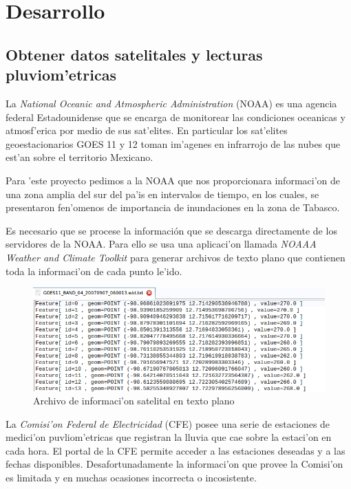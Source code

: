 \chapter{Desarrollo}

\section{Obtener datos satelitales y lecturas pluviom'etricas}

  La  \textit{National Oceanic and Atmospheric Administration} (NOAA) es una agencia federal Estadounidense que se encarga de 
  monitorear las condiciones oceanicas y atmosf'erica por medio de sus sat'elites.
  En particular los sat'elites geoestacionarios GOES 11 y 12 toman im'agenes en infrarrojo de las nubes que est'an sobre
  el territorio Mexicano.

  Para 'este proyecto pedimos a la NOAA que nos proporcionara informaci'on de una zona amplia del sur del pa'is en 
  intervalos de tiempo, en los cuales, se presentaron fen'omenos de importancia de inundaciones en la zona de Tabasco.

  Es necesario que se procese la información que se descarga directamente de los servidores de la NOAA. Para ello se usa
  una aplicaci'on llamada \textit{NOAAA Weather and Climate Toolkit} para generar archivos de texto plano que contienen
  toda la informaci'on de cada punto le'ido.

  \begin{figure}[h!]
  \centering
  \includegraphics[width=170mm]{./imagenes/archivoTxt.png}
  \caption{Archivo de informaci'on satelital en texto plano}
  \end{figure}


  La \textit{Comisi'on Federal de Electricidad} (CFE) posee una serie de estaciones de medici'on puvliom'etricas que registran 
  la lluvia que cae sobre la estaci'on en cada hora. El portal de la CFE permite acceder a las estaciones deseadas 
  y a las fechas disponibles. Desafortunadamente la informaci'on que provee la Comisi'on es limitada y en muchas 
  ocasiones incorrecta o incosistente.




